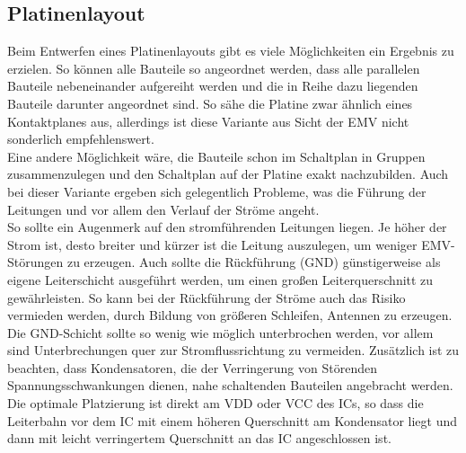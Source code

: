 \subsection{Platinenlayout}
Beim Entwerfen eines Platinenlayouts gibt es viele Möglichkeiten ein Ergebnis zu erzielen. So können alle Bauteile so angeordnet werden, dass alle parallelen Bauteile nebeneinander aufgereiht werden und die in Reihe dazu liegenden Bauteile darunter angeordnet sind. So sähe die Platine zwar ähnlich eines Kontaktplanes aus, allerdings ist diese Variante aus Sicht der EMV nicht sonderlich empfehlenswert.\\
Eine andere Möglichkeit wäre, die Bauteile schon im Schaltplan in Gruppen zusammenzulegen und den Schaltplan auf der Platine exakt nachzubilden. Auch bei dieser Variante ergeben sich gelegentlich Probleme, was die Führung der Leitungen und vor allem den Verlauf der Ströme angeht.\\
So sollte ein Augenmerk auf den stromführenden Leitungen liegen. Je höher der Strom ist, desto breiter und kürzer ist die Leitung auszulegen, um weniger EMV-Störungen zu erzeugen. Auch sollte die Rückführung (GND) günstigerweise als eigene Leiterschicht ausgeführt werden, um einen großen Leiterquerschnitt zu gewährleisten. So kann bei der Rückführung der Ströme auch das Risiko vermieden werden, durch Bildung von größeren Schleifen, Antennen zu erzeugen. Die GND-Schicht sollte so wenig wie möglich unterbrochen werden, vor allem sind Unterbrechungen quer zur Stromflussrichtung zu vermeiden. Zusätzlich ist zu beachten, dass Kondensatoren, die der Verringerung von Störenden Spannungsschwankungen dienen, nahe schaltenden Bauteilen angebracht werden. Die optimale Platzierung ist direkt am VDD oder VCC des ICs, so dass die Leiterbahn vor dem IC mit einem höheren Querschnitt am Kondensator liegt und dann mit leicht verringertem Querschnitt an das IC angeschlossen ist.


